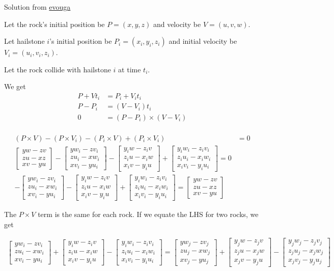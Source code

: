 \documentclass{article}
\newcommand*\mat[1]{\begin{bmatrix}#1\end{bmatrix}}
\begin{document}
Solution from \href{https://old.reddit.com/r/adventofcode/comments/18pnycy/2023_day_24_solutions/kepu26z/}{evouga}

Let the rock's initial position be $P=(x,y,z)$ and velocity be $V=(u,v,w)$.

Let hailstone $i$'s initial position be $P_i=(x_i,y_i,z_i)$ and initial velocity
be $V_i=(u_i,v_i,z_i)$.

Let the rock collide with hailstone $i$ at time $t_i$.

We get
\begin{align*}
P+Vt_i &= P_i+V_it_i\\
P-P_i &= (V-V_i)t_i\\
0 &= (P-P_i)\times(V-V_i) \tag{parallel vectors have cross product 0}\\
\end{align*}

\begin{align*}
(P\times V)-(P\times V_i)-(P_i\times V)+(P_i\times V_i) &= 0\\
\mat{yw-zv\\zu-xz\\xv-yu} - \mat{yw_i-zv_i\\zu_i-xw_i\\xv_i-yu_i}
-\mat{y_iw-z_iv\\z_iu-x_iw\\x_iv-y_iu} +\mat{y_iw_i-z_iv_i\\z_iu_i-x_iw_i\\x_iv_i-y_iu_i} = 0\\
-\mat{yw_i-zv_i\\zu_i-xw_i\\xv_i-yu_i}-\mat{y_iw-z_iv\\z_iu-x_iw\\x_iv-y_iu} +\mat{y_iw_i-z_iv_i\\z_iu_i-x_iw_i\\x_iv_i-y_iu_i} =
\mat{yw-zv\\zu-xz\\xv-yu}
\end{align*}

The $P\times V$ term is the same for each rock. If we equate the LHS for two rocks, we get

\begin{align*}
\mat{yw_i-zv_i\\zu_i-xw_i\\xv_i-yu_i}+\mat{y_iw-z_iv\\z_iu-x_iw\\x_iv-y_iu}-\mat{y_iw_i-z_iv_i\\z_iu_i-x_iw_i\\x_iv_i-y_iu_i}=
\mat{yw_j-zv_j\\zu_j-xw_j\\xv_j-yu_j}+\mat{y_jw-z_jv\\z_ju-x_jw\\x_jv-y_ju}-\mat{y_jw_j-z_jv_j\\z_ju_j-x_jw_j\\x_jv_j-y_ju_j}\\
\end{align*}
\end{document}
